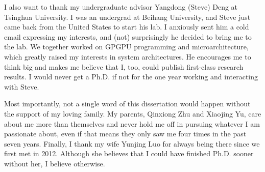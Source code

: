 \begin{acknowledgments}
I also want to thank my undergraduate advisor Yangdong (Steve) Deng at Tsinghua University. I was an undergrad at Beihang University, and Steve just came back from the United States to start his lab. I anxiously sent him a cold email expressing my interests, and (not) surprisingly he decided to bring me to the lab. We together worked on GPGPU programming and microarchitecture, which greatly raised my interests in system architectures. He encourages me to think big and makes me believe that I, too, could publish first-class research results. I would never get a Ph.D. if not for the one year working and interacting with Steve.

Most importantly, not a single word of this dissertation would happen without the support of my loving family. My parents, Qinxiong Zhu and Xiaojing Yu, care about me more than themselves and never hold me off in pursuing whatever I am passionate about, even if that means they only saw me four times in the past seven years. Finally, I thank my wife Yunjing Luo for always being there since we first met in 2012. Although she believes that I could have finished Ph.D. sooner without her, I believe otherwise.

\end{acknowledgments}

